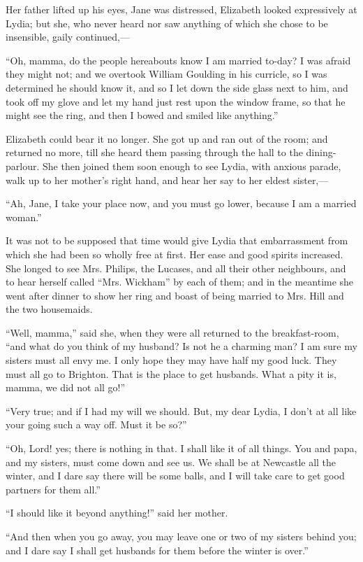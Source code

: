 \documentclass[12pt,openright]{book}
\begin{document}
Her father lifted up his eyes, Jane was distressed, Elizabeth looked expressively at Lydia; but she, who never heard nor saw anything of which she chose to be insensible, gaily continued,—

“Oh, mamma, do the people hereabouts know I am married to-day? I was afraid they might not; and we overtook William Goulding in his curricle, so I was determined he should know it, and so I let down the side glass next to him, and took off my glove and let my hand just rest upon the window frame, so that he might see the ring, and then I bowed and smiled like anything.”

Elizabeth could bear it no longer. She got up and ran out of the room; and returned no more, till she heard them passing through the hall to the dining-parlour. She then joined them soon enough to see Lydia, with anxious parade, walk up to her mother’s right hand, and hear her say to her eldest sister,—

“Ah, Jane, I take your place now, and you must go lower, because I am a married woman.”

It was not to be supposed that time would give Lydia that embarrassment from which she had been so wholly free at first. Her ease and good spirits increased. She longed to see Mrs. Philips, the Lucases, and all their other neighbours, and to hear herself called “Mrs. Wickham” by each of them; and in the meantime she went after dinner to show her ring and boast of being married to Mrs. Hill and the two housemaids.

“Well, mamma,” said she, when they were all returned to the breakfast-room, “and what do you think of my husband? Is not he a charming man? I am sure my sisters must all envy me. I only hope they may have half my good luck. They must all go to Brighton. That is the place to get husbands. What a pity it is, mamma, we did not all go!”

“Very true; and if I had my will we should. But, my dear Lydia, I don’t at all like your going such a way off. Must it be so?”

“Oh, Lord! yes; there is nothing in that. I shall like it of all things. You and papa, and my sisters, must come down and see us. We shall be at Newcastle all the winter, and I dare say there will be some balls, and I will take care to get good partners for them all.”

“I should like it beyond anything!” said her mother.

“And then when you go away, you may leave one or two of my sisters behind you; and I dare say I shall get husbands for them before the winter is over.”
\end{document}
